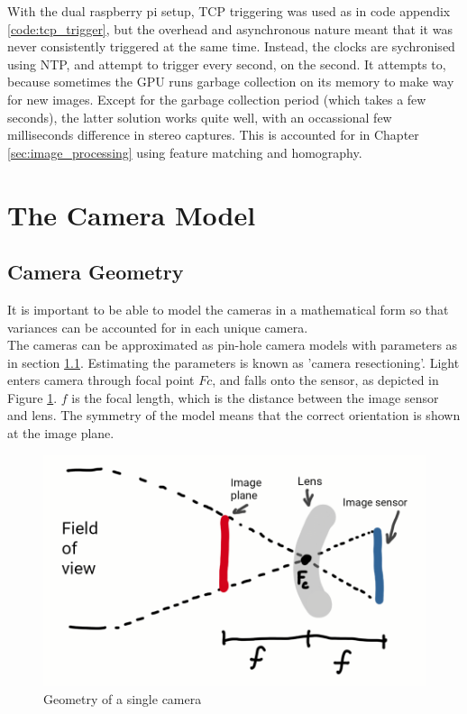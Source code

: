 With the dual raspberry pi setup, TCP triggering was used as in code appendix \ref{code:tcp_trigger}, but the overhead and asynchronous nature meant that it was never consistently triggered at the same time. Instead, the clocks are sychronised using NTP, and attempt to trigger every second, on the second. It attempts to, because sometimes the GPU runs garbage collection on its memory to make way for new images. Except for the garbage collection period (which takes a few seconds), the latter solution works quite well, with an occassional few milliseconds difference in stereo captures. This is accounted for in Chapter \ref{sec:image_processing} using feature matching and homography.

\section{The Camera Model}
\subsection{Camera Geometry}
\label{sec:pinhole}

It is important to be able to model the cameras in a mathematical form so that variances can be accounted for in each unique camera.\\

The cameras can be approximated as pin-hole camera models with parameters as in section \ref{sec:pinhole}. Estimating the parameters is known as 'camera resectioning'. Light enters camera through focal point $Fc$, and falls onto the sensor, as depicted in Figure \ref{fig:camera_geometry}. $f$ is the focal length, which is the distance between the image sensor and lens. The symmetry of the model means that the correct orientation is shown at the image plane.

\begin{figure}[H]
\centering
\includegraphics[scale=0.35]{images/camera_geometry.png}
\caption{Geometry of a single camera}
\label{fig:camera_geometry}
\end{figure}

